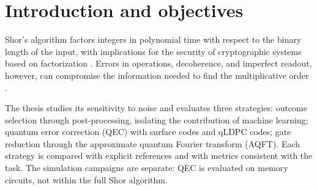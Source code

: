 \section{Introduction and objectives}

Shor's algorithm factors integers in polynomial time with respect to the binary length of
the input, with implications for the security of cryptographic systems based on
factorization \cite{en-shor1994,en-nist2024pqc,en-gidney2021}. Errors in operations,
decoherence, and imperfect readout, however, can compromise the information needed to find
the multiplicative order \cite{en-preskill2018}.

The thesis studies its sensitivity to noise and evaluates three strategies: outcome
selection through post-processing, isolating the contribution of machine learning; quantum
error correction (QEC) with surface codes and qLDPC codes; gate reduction through the
approximate quantum Fourier transform (AQFT). Each strategy is compared with explicit
references and with metrics consistent with the task. The simulation campaigns are
separate: QEC is evaluated on memory circuits, not within the full Shor algorithm.
